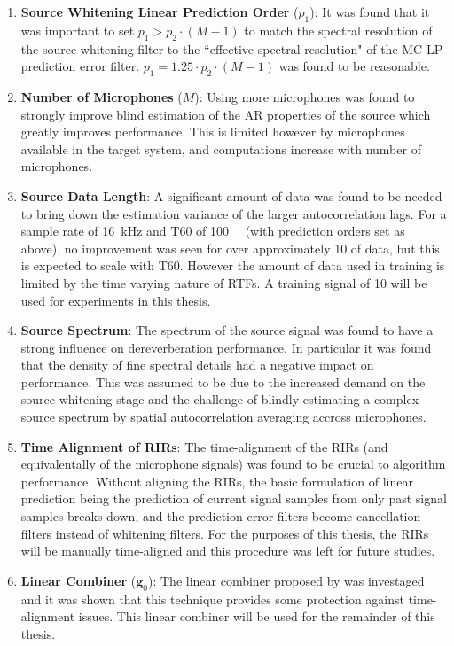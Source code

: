 \begin{enumerate}
	\item \textbf{Source Whitening Linear Prediction Order} ($p_1$): It was found that it was important to set $p_1 > p_2 \cdot \left(M-1\right)$ to match the spectral resolution of the source-whitening filter to the ``effective spectral resolution" of the MC-LP prediction error filter. $p_1 = 1.25 \cdot p_2 \cdot \left(M-1\right)$ was found to be reasonable.
	\item \textbf{Number of Microphones} ($M$): Using more microphones was found to strongly improve blind estimation of the AR properties of the source which greatly improves performance. This is limited however by microphones available in the target system, and computations increase with number of microphones.
	\item \textbf{Source Data Length}: A significant amount of data was found to be needed to bring down the estimation variance of the larger autocorrelation lags. For a sample rate of \qty{16}{\kilo\hertz} and T60 of \qty{100}{\milli\sec} (with prediction orders set as above), no improvement was seen for over approximately \qty{10}{\sec} of data, but this is expected to scale with T60. However the amount of data used in training is limited by the time varying nature of RTFs. A training signal of \qty{10}{\sec} will be used for experiments in this thesis.
	\item \textbf{Source Spectrum}: The spectrum of the source signal was found to have a strong influence on dereverberation performance. In particular it was found that the density of fine spectral details had a negative impact on performance. This was assumed to be due to the increased demand on the source-whitening stage and the challenge of blindly estimating a complex source spectrum by spatial autocorrelation averaging accross microphones.
	\item \textbf{Time Alignment of RIRs}: The time-alignment of the RIRs (and equivalentally of the microphone signals) was found to be crucial to algorithm performance. Without aligning the RIRs, the basic formulation of linear prediction being the prediction of current signal samples from only past signal samples breaks down, and the prediction error filters become cancellation filters instead of whitening filters. For the purposes of this thesis, the RIRs will be manually time-aligned and this procedure was left for future studies.
	\item \textbf{Linear Combiner} ($\boldsymbol{g}_0$): The linear combiner proposed by \cite{triki2006delay} was investaged and it was shown that this technique provides some protection against time-alignment issues. This linear combiner will be used for the remainder of this thesis.
\end{enumerate}

